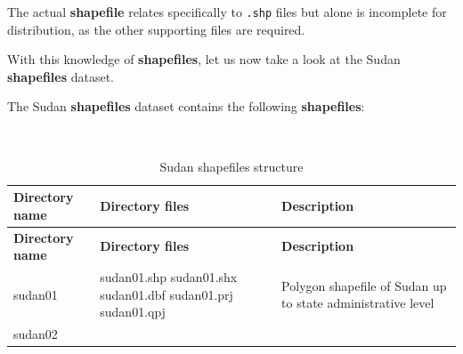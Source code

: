 \documentclass[12pt,a4paper,a4paper]{book}
\theoremstyle{definition}
\theoremstyle{definition}
\theoremstyle{definition}
\theoremstyle{remark}
\begin{document}
The actual \textbf{shapefile} relates specifically to \texttt{.shp}
files but alone is incomplete for distribution, as the other supporting
files are required.

With this knowledge of \textbf{shapefiles}, let us now take a look at
the Sudan \textbf{shapefiles} dataset.

The Sudan \textbf{shapefiles} dataset contains the following
\textbf{shapefiles}:

~

\begin{longtable}[]{@{}lll@{}}
\caption{\label{tab:table1} Sudan shapefiles structure}\tabularnewline
\toprule
\begin{minipage}[b]{0.23\columnwidth}\raggedright
\textbf{Directory name}\strut
\end{minipage} & \begin{minipage}[b]{0.23\columnwidth}\raggedright
\textbf{Directory files}\strut
\end{minipage} & \begin{minipage}[b]{0.45\columnwidth}\raggedright
\textbf{Description}\strut
\end{minipage}\tabularnewline
\midrule
\endfirsthead
\toprule
\begin{minipage}[b]{0.23\columnwidth}\raggedright
\textbf{Directory name}\strut
\end{minipage} & \begin{minipage}[b]{0.23\columnwidth}\raggedright
\textbf{Directory files}\strut
\end{minipage} & \begin{minipage}[b]{0.45\columnwidth}\raggedright
\textbf{Description}\strut
\end{minipage}\tabularnewline
\midrule
\endhead
\begin{minipage}[t]{0.23\columnwidth}\raggedright
sudan01\strut
\end{minipage} & \begin{minipage}[t]{0.23\columnwidth}\raggedright
sudan01.shp sudan01.shx sudan01.dbf sudan01.prj sudan01.qpj\strut
\end{minipage} & \begin{minipage}[t]{0.45\columnwidth}\raggedright
Polygon shapefile of Sudan up to state administrative level\strut
\end{minipage}\tabularnewline
\begin{minipage}[t]{0.23\columnwidth}\raggedright
sudan02\strut
\end{minipage} & \begin{minipage}[t]{0.23\columnwidth}\raggedright

\end{minipage}
\end{longtable}
\end{document}
